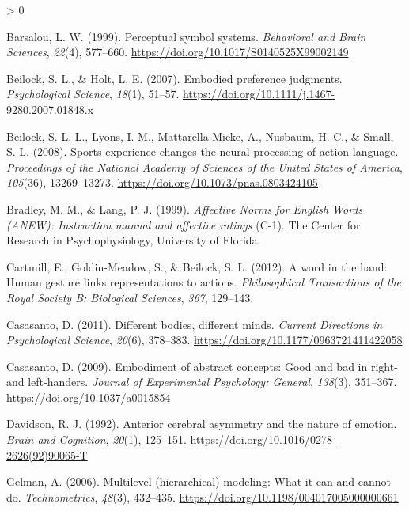 \documentclass[
  english,
  man,mask]{apa7}
\newlength{\cslhangindent}
\newenvironment{CSLReferences}[2] %
 {%
  \setlength{\parindent}{0pt}
  \ifodd #1 \everypar{\setlength{\hangindent}{\cslhangindent}}\ignorespaces\fi
  \ifnum #2 > 0
  \setlength{\parskip}{#2\baselineskip}
  \fi
 }%
 {}
\begin{document}
\hypertarget{refs}{}
\begin{CSLReferences}{1}{0}
\leavevmode\hypertarget{ref-Barsalou1999}{}%
Barsalou, L. W. (1999). {Perceptual symbol systems}. \emph{Behavioral and Brain Sciences}, \emph{22}(4), 577--660. \url{https://doi.org/10.1017/S0140525X99002149}

\leavevmode\hypertarget{ref-Beilock2007}{}%
Beilock, S. L., \& Holt, L. E. (2007). {Embodied preference judgments}. \emph{Psychological Science}, \emph{18}(1), 51--57. \url{https://doi.org/10.1111/j.1467-9280.2007.01848.x}

\leavevmode\hypertarget{ref-Beilock2008}{}%
Beilock, S. L. L., Lyons, I. M., Mattarella-Micke, A., Nusbaum, H. C., \& Small, S. L. (2008). {Sports experience changes the neural processing of action language}. \emph{Proceedings of the National Academy of Sciences of the United States of America}, \emph{105}(36), 13269--13273. \url{https://doi.org/10.1073/pnas.0803424105}

\leavevmode\hypertarget{ref-Bradley1999}{}%
Bradley, M. M., \& Lang, P. J. (1999). \emph{{Affective Norms for English Words (ANEW): Instruction manual and affective ratings}} (C-1). The Center for Research in Psychophysiology, University of Florida.

\leavevmode\hypertarget{ref-Cartmill2012}{}%
Cartmill, E., Goldin-Meadow, S., \& Beilock, S. L. (2012). {A word in the hand: Human gesture links representations to actions}. \emph{Philosophical Transactions of the Royal Society B: Biological Sciences}, \emph{367}, 129--143.

\leavevmode\hypertarget{ref-Casasanto2011}{}%
Casasanto, D. (2011). {Different bodies, different minds}. \emph{Current Directions in Psychological Science}, \emph{20}(6), 378--383. \url{https://doi.org/10.1177/0963721411422058}

\leavevmode\hypertarget{ref-Casasanto2009}{}%
Casasanto, D. (2009). {Embodiment of abstract concepts: Good and bad in right- and left-handers.} \emph{Journal of Experimental Psychology: General}, \emph{138}(3), 351--367. \url{https://doi.org/10.1037/a0015854}

\leavevmode\hypertarget{ref-Davidson1992}{}%
Davidson, R. J. (1992). {Anterior cerebral asymmetry and the nature of emotion}. \emph{Brain and Cognition}, \emph{20}(1), 125--151. \url{https://doi.org/10.1016/0278-2626(92)90065-T}

\leavevmode\hypertarget{ref-Gelman2006}{}%
Gelman, A. (2006). {Multilevel (hierarchical) modeling: What it can and cannot do.} \emph{Technometrics}, \emph{48}(3), 432--435. \url{https://doi.org/10.1198/004017005000000661}


\end{CSLReferences}
\end{document}
